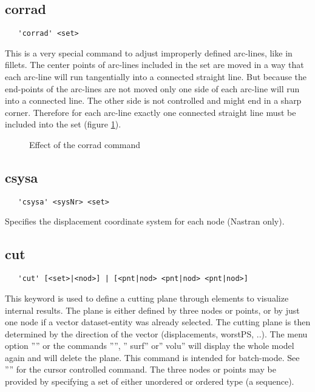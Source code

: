 \documentclass{article}
\begin{document}
\subsection{\label{corrad}corrad}
\begin{verbatim}
   'corrad' <set>
\end{verbatim}
This is a very special command to adjust improperly defined arc-lines, like in fillets. The center points of arc-lines included in the set are moved in a way that each arc-line will run tangentially into a connected straight line. But because the end-points of the arc-lines are not moved only one side of each arc-line will run into a connected line. The other side is not controlled and might end in a sharp corner. Therefore for each arc-line exactly one connected straight line must be included into the set (figure \ref{corradp}).

\begin{figure}[h]
\caption{\label{corradp} Effect of the corrad command }
\end{figure}

\subsection{\label{csysa}csysa}
\begin{verbatim}
   'csysa' <sysNr> <set>                                                               
\end{verbatim}
Specifies the displacement coordinate system for each node (Nastran only).

\subsection{\label{cut}cut}
\begin{verbatim}
   'cut' [<set>|<nod>] | [<pnt|nod> <pnt|nod> <pnt|nod>]
\end{verbatim}
This keyword is used to define a cutting plane through elements to visualize internal results. The plane is either defined by three nodes or points, or by just one node if a vector dataset-entity was already selected. The cutting plane is then determined by the direction of the vector (displacements, worstPS, ..). The menu option '''' or the commands '''', '' surf'' or'' volu'' will display the whole model again and will delete the plane. This command is intended for batch-mode. See '''' for the cursor controlled command. The three nodes or points may be provided by specifying a set of either unordered or ordered type (a sequence).
\end{document}
